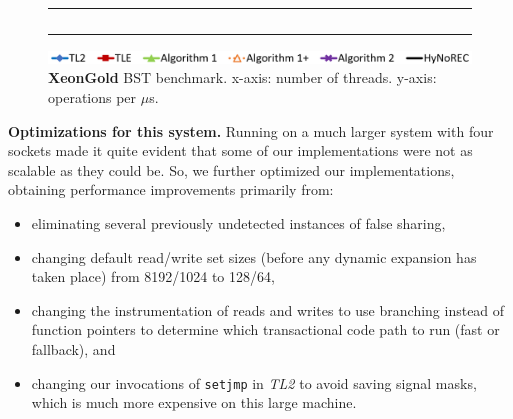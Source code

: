 \begin{figure}
\begin{minipage}{1\linewidth}
\begin{tabular}{m{0.03\linewidth}m{0.485\linewidth}m{0.485\linewidth}}
        \vspace{-5mm}\includegraphics[width=\linewidth]{figures/2021jun16/exp1_nonspec_throughput_exp_'20_0_20_0'_100000_rq_1.png}
        \\
    \end{tabular}
\end{minipage}
	\includegraphics[width=.75\linewidth]{figures/2021jun16/legend.png}
\caption{\textbf{XeonGold} BST benchmark. x-axis: number of threads. y-axis: operations per $\mu$s.}
\label{fig-exp-xeongold}
\end{figure}

\vspace{1mm}\noindent\textbf{Optimizations for this system.}
%
Running on a much larger system with four sockets made it quite evident that some of our implementations were not as scalable as they could be.
So, we further optimized our implementations, obtaining performance improvements primarily from:
\begin{itemize}
\item eliminating several previously undetected instances of false sharing,
\item changing default read/write set sizes (before any dynamic expansion has taken place) from 8192/1024 to 128/64,
\item changing the instrumentation of reads and writes to use branching instead of function pointers to determine which transactional code path to run (fast or fallback), and
\item changing our invocations of \texttt{setjmp} in \textit{TL2} to avoid saving signal masks, which is much more expensive on this large machine.
\end{itemize}

